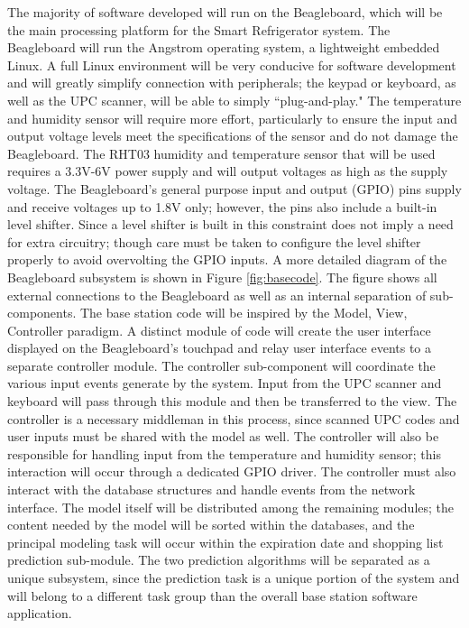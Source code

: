 \documentclass[11pt]{article} %
\begin{document}
The majority of software developed will run on the Beagleboard, which will be the main processing platform for the Smart Refrigerator system. The Beagleboard will run the Angstrom operating system, a lightweight embedded Linux. A full Linux environment will be very conducive for software development and will greatly simplify connection with peripherals; the keypad or keyboard, as well as the UPC scanner, will be able to simply ``plug-and-play." The temperature and humidity sensor will require more effort, particularly to ensure the input and output voltage levels meet the specifications of the sensor and do not damage the Beagleboard. The RHT03 humidity and temperature sensor that will be used requires a 3.3V-6V power supply and will output voltages as high as the supply voltage. The Beagleboard's general purpose input and output (GPIO) pins supply and receive voltages up to 1.8V only; however, the pins also include a built-in level shifter. Since a level shifter is built in this constraint does not imply a need for extra circuitry; though care must be taken to configure the level shifter properly to avoid overvolting the GPIO inputs.
\newline \indent \newline
A more detailed diagram of the Beagleboard subsystem is shown in Figure \ref{fig:basecode}. The figure shows all external connections to the Beagleboard as well as an internal separation of sub-components. The base station code will be inspired by the Model, View, Controller paradigm. A distinct module of code will create the user interface displayed on the Beagleboard's touchpad and relay user interface events to a separate controller module. The controller sub-component will coordinate the various input events generate by the system. Input from the UPC scanner and keyboard will pass through this module and then be transferred to the view. The controller is a necessary middleman in this process, since scanned UPC codes and user inputs must be shared with the model as well. The controller will also be responsible for handling input from the temperature and humidity sensor; this interaction will occur through a dedicated GPIO driver. The controller must also interact with the database structures and handle events from the network interface. The model itself will be distributed among the remaining modules; the content needed by the model will be sorted within the databases, and the principal modeling task will occur within the expiration date and shopping list prediction sub-module. The two prediction algorithms will be separated as a unique subsystem, since the prediction task is a unique portion of the system and will belong to a different task group than the overall base station software application.
\end{document}

